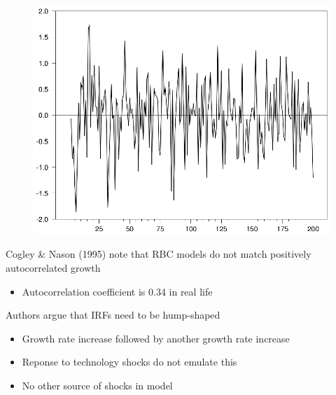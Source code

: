 \documentclass{beamer}
\begin{document}
\begin{frame}
  \begin{figure}
    \includegraphics[scale=.9]{rbc3.eps}
  \end{figure}
\end{frame}

\begin{frame}
  Cogley \& Nason (1995) note that RBC models do not match positively autocorrelated growth
  \begin{itemize}
    \item Autocorrelation coefficient is 0.34 in real life
  \end{itemize}
  \medskip
  Authors argue that IRFs need to be hump-shaped
  \begin{itemize}
    \item Growth rate increase followed by another growth rate increase
    \item Reponse to technology shocks do not emulate this
    \item No other source of shocks in model
  \end{itemize}
  \end{frame}
\end{document}
